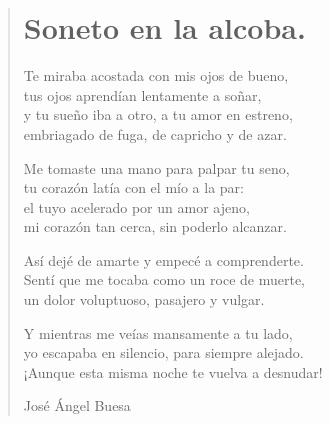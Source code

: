 \documentclass[11pt, portrait, twoside, notitlepage, openright]{book}
\begin{document}
\newpage
\begin{verse}
\begin{center}
\section{Soneto en la alcoba.}
\end{center}
Te miraba acostada con mis ojos de bueno,\\
tus ojos aprendían lentamente a soñar,\\
y tu sueño iba a otro, a tu amor en estreno,\\
embriagado de fuga, de capricho y de azar.
\newline

Me tomaste una mano para palpar tu seno,\\
tu corazón latía con el mío a la par:\\
el tuyo acelerado por un amor ajeno,\\
mi corazón tan cerca, sin poderlo alcanzar.
\newline

Así dejé de amarte y empecé a comprenderte.\\
Sentí que me tocaba como un roce de muerte,\\
un dolor voluptuoso, pasajero y vulgar.
\newline

Y mientras me veías mansamente a tu lado,\\
yo escapaba en silencio, para siempre alejado.\\
¡Aunque esta misma noche te vuelva a desnudar!
\newline

José Ángel Buesa
\end{verse}
\end{document}
